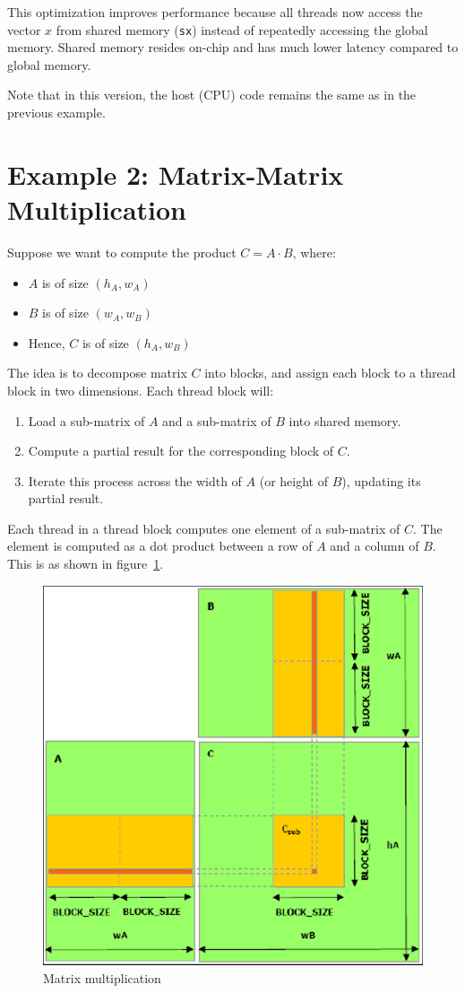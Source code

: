 \documentclass[12pt]{book}
\begin{document}
This optimization improves performance because all threads now access the vector $x$ from shared memory (\texttt{sx}) instead of repeatedly accessing the global memory. Shared memory resides on-chip and has much lower latency compared to global memory.

Note that in this version, the host (CPU) code remains the same as in the previous example.

\section{Example 2: Matrix-Matrix Multiplication}

Suppose we want to compute the product $C = A \cdot B$, where:
\begin{itemize}
    \item $A$ is of size $(h_A, w_A)$
    \item $B$ is of size $(w_A, w_B)$
    \item Hence, $C$ is of size $(h_A, w_B)$
\end{itemize}

The idea is to decompose matrix $C$ into blocks, and assign each block to a thread block in two dimensions. Each thread block will:
\begin{enumerate}
    \item Load a sub-matrix of $A$ and a sub-matrix of $B$ into shared memory.
    \item Compute a partial result for the corresponding block of $C$.
    \item Iterate this process across the width of $A$ (or height of $B$), updating its partial result.
\end{enumerate}

Each thread in a thread block computes one element of a sub-matrix of $C$. The element is computed as a dot product between a row of $A$ and a column of $B$. This is as shown in figure~\ref{fig:matmul_cuda}.
\begin{figure}[ht]
    \centering
    \includegraphics[width=0.5\linewidth]{images/matmul_cuda.png}
    \caption{Matrix multiplication}
    \label{fig:matmul_cuda}
\end{figure}
\end{document}
